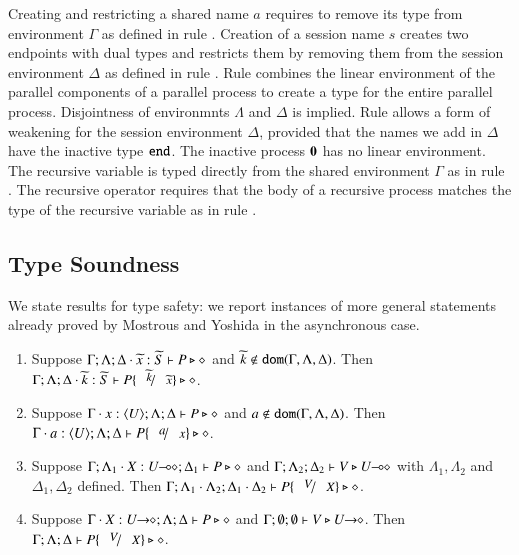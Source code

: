 Creating and restricting a
 shared name $a$ requires to remove
its type from environment $\Gamma$ as defined in 
rule . 
Creation of a session name $s$
creates two endpoints with dual types and restricts
them by removing them from the session environment
$\Delta$ as defined in rule . Rule
 combines the linear environment of
the parallel components of a parallel process
to create a type for the entire parallel process.
Disjointness of environmnts $\Lambda$ and $\Delta$
is implied. Rule  allows a form of weakening 
for the session environment $\Delta$, provided that
the names we add in $\Delta$ have the inactive
type $\mathtt{end}$. The inactive process $\mathbf{0}$ has no
linear environment. The recursive variable is typed
directly from the shared environment $\Gamma$ as
in rule .
The recursive operator requires that the body of
a recursive process matches the type of the recursive
variable as in rule . 



\subsection{Type Soundness}
We state results for type safety:
we report instances of more general statements already proved by
Mostrous and Yoshida in the asynchronous case.

\begin{lemma}\rm
	\label{lem:subst}
	\begin{enumerate}[1.]
		\item	Suppose $\Gamma; \Lambda; \Delta \cdot \widetilde{x}:\widetilde{S}  \vdash P \triangleright \diamond$ and
			$\widetilde{k} \not\in \mathtt{dom}(\Gamma, \Lambda, \Delta)$. 
			Then $\Gamma; \Lambda; \Delta \cat \widetilde{k}:\widetilde{S}  \vdash P\subst{\widetilde{k}}{\widetilde{x}} \hastype \Proc$.

		\item	Suppose $\Gamma \cdot x:\langle U \rangle; \Lambda; \Delta \vdash P \triangleright \diamond$ and
			$a \notin \mathtt{dom}(\Gamma, \Lambda, \Delta)$. 
			Then $\Gamma \cat a:\chtype{U}; \Lambda; \Delta   \vdash P\subst{a}{x} \hastype \Proc$.

		\item	Suppose $\Gamma; \Lambda_1 \cdot X:U\!\! \multimap\!\! \diamond; \Delta_1  \vdash P \triangleright \diamond$ 
			and $\Gamma; \Lambda_2; \Delta_2  \vdash V \triangleright U\!\! \multimap\!\! \diamond$ with 
			$\Lambda_1, \Lambda_2$ and $\Delta_1, \Delta_2$ defined.  
			Then $\Gamma; \Lambda_1 \cat \Lambda_2; \Delta_1 \cat \Delta_2  \proves P\subst{V}{X} \hastype \Proc$.

		\item	Suppose $\Gamma \cdot X:U\!\! \rightarrow\!\! \diamond; \Lambda; \Delta  \vdash P \triangleright \diamond$ and
			$\Gamma; \emptyset ; \emptyset  \vdash V \triangleright U\!\! \rightarrow\!\! \diamond$.
			Then $\Gamma; \Lambda; \Delta  \proves P\subst{V}{X} \hastype \Proc$.
		\end{enumerate}
\end{lemma}


